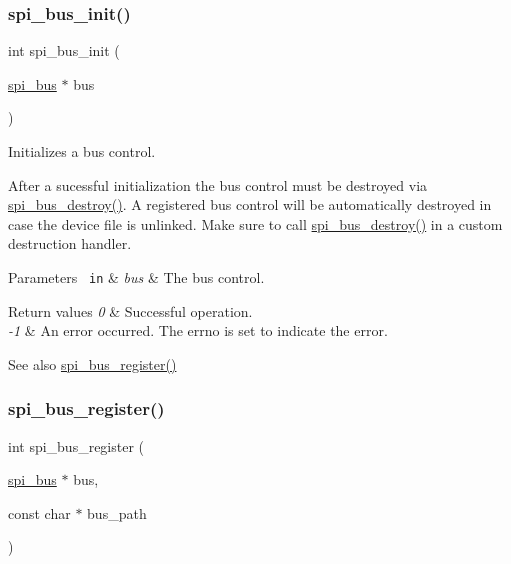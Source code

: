 \subsubsection{\texorpdfstring{spi\_bus\_init()}{spi\_bus\_init()}}
{\footnotesize\ttfamily int spi\+\_\+bus\+\_\+init (\begin{DoxyParamCaption}\item[{\mbox{\hyperlink{structspi__bus}{spi\+\_\+bus}} $\ast$}]{bus }\end{DoxyParamCaption})}



Initializes a bus control. 

After a sucessful initialization the bus control must be destroyed via \mbox{\hyperlink{group__SPI_ga6d316300e2bb231728d32b5dda355dcd}{spi\+\_\+bus\+\_\+destroy()}}. A registered bus control will be automatically destroyed in case the device file is unlinked. Make sure to call \mbox{\hyperlink{group__SPI_ga6d316300e2bb231728d32b5dda355dcd}{spi\+\_\+bus\+\_\+destroy()}} in a custom destruction handler.


\begin{DoxyParams}[1]{Parameters}
\mbox{\texttt{ in}}  & {\em bus} & The bus control.\\
\hline
\end{DoxyParams}

\begin{DoxyRetVals}{Return values}
{\em 0} & Successful operation. \\
\hline
{\em -\/1} & An error occurred. The errno is set to indicate the error.\\
\hline
\end{DoxyRetVals}
\begin{DoxySeeAlso}{See also}
\mbox{\hyperlink{group__SPI_ga4e6ca0b1d473a6be4fbbefa2ed1a55f2}{spi\+\_\+bus\+\_\+register()}} 
\end{DoxySeeAlso}
\mbox{\label{group__SPI_ga4e6ca0b1d473a6be4fbbefa2ed1a55f2}} 
\subsubsection{\texorpdfstring{spi\_bus\_register()}{spi\_bus\_register()}}
{\footnotesize\ttfamily int spi\+\_\+bus\+\_\+register (\begin{DoxyParamCaption}\item[{\mbox{\hyperlink{structspi__bus}{spi\+\_\+bus}} $\ast$}]{bus,  }\item[{const char $\ast$}]{bus\+\_\+path }\end{DoxyParamCaption})}



